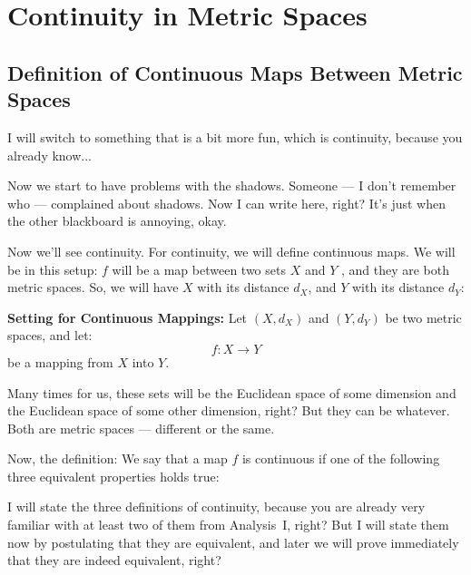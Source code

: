 \section{Continuity in Metric Spaces}

\subsection{Definition of Continuous Maps Between Metric Spaces}

\begin{speech}[00:56:54 - 00:58:23]
I will switch to something that is a bit more fun, which is continuity, because you already know...

Now we start to have problems with the shadows. Someone --- I don't remember who --- complained about shadows. Now I can write here, right? It's just when the other blackboard is annoying, okay.

Now we'll see continuity.  For continuity, we will define continuous maps. We will be in this setup: $f$ will be a map between two sets $X$ and $Y$ , and they are both metric spaces. So, we will have $X$ with its distance $d_X$, and $Y$ with its distance $d_Y$: 
\end{speech}

\begin{content}
\textbf{Setting for Continuous Mappings:}
Let $(X, d_X)$ and $(Y, d_Y)$ be two metric spaces, and let:
\[
f \colon X \to Y
\]
be a mapping from $X$ into $Y$.
\end{content}

\begin{speech}[00:58:23 - 00:59:43]
Many times for us, these sets will be the Euclidean space of some dimension and the Euclidean space of some other dimension, right? But they can be whatever. Both are metric spaces --- different or the same.

Now, the definition:  We say that a map $f$ is continuous  if one of the following three equivalent properties holds true: 

I will state the three definitions of continuity, because you are already very familiar with at least two of them from Analysis~I, right? But I will state them now by postulating that they are equivalent, and later we will prove immediately that they are indeed equivalent, right?
\end{speech}

